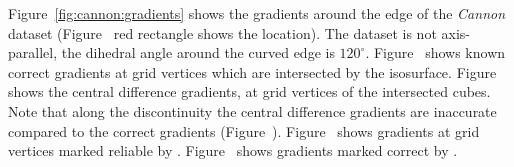 Figure~\ref{fig:cannon:gradients} shows the gradients around the edge of the \textit{Cannon} dataset (Figure~ red rectangle shows the location). The dataset is not axis-parallel, the dihedral angle around the curved edge is $120^\circ$. Figure~ shows known correct gradients at grid vertices which are intersected by the isosurface. Figure~ shows the central difference  gradients, at grid vertices of the intersected cubes. Note that along the discontinuity the central difference gradients are inaccurate compared to the correct gradients (Figure~). Figure~ shows gradients at grid vertices marked reliable by \FindReliable. Figure~ shows gradients marked correct by \ReliGrad.

